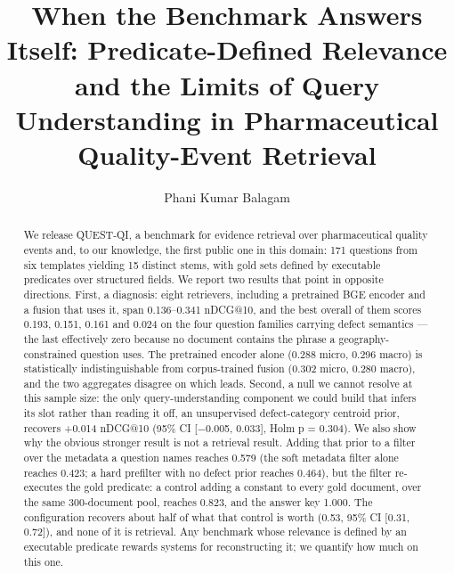 \documentclass[runningheads]{llncs}
\begin{document}
\title{When the Benchmark Answers Itself: Predicate-Defined Relevance and the Limits of Query Understanding in Pharmaceutical Quality-Event Retrieval}
\author{Phani Kumar Balagam}

\maketitle

\begin{abstract}
We release QUEST-QI, a benchmark for evidence retrieval over pharmaceutical quality events and, to our knowledge, the first public one in this domain: 171 questions from six templates yielding 15 distinct stems, with gold sets defined by executable predicates over structured fields. We report two results that point in opposite directions. First, a diagnosis: eight retrievers, including a pretrained BGE encoder and a fusion that uses it, span 0.136--0.341 nDCG@10, and the best overall of them scores 0.193, 0.151, 0.161 and 0.024 on the four question families carrying defect semantics --- the last effectively zero because no document contains the phrase a geography-constrained question uses. The pretrained encoder alone (0.288 micro, 0.296 macro) is statistically indistinguishable from corpus-trained fusion (0.302 micro, 0.280 macro), and the two aggregates disagree on which leads. Second, a null we cannot resolve at this sample size: the only query-understanding component we could build that infers its slot rather than reading it off, an unsupervised defect-category centroid prior, recovers +0.014 nDCG@10 (95\% CI [$-$0.005, 0.033], Holm p = 0.304). We also show why the obvious stronger result is not a retrieval result. Adding that prior to a filter over the metadata a question names reaches 0.579 (the soft metadata filter alone reaches 0.423; a hard prefilter with no defect prior reaches 0.464), but the filter re-executes the gold predicate: a control adding a constant to every gold document, over the same 300-document pool, reaches 0.823, and the answer key 1.000. The configuration recovers about half of what that control is worth (0.53, 95\% CI [0.31, 0.72]), and none of it is retrieval. Any benchmark whose relevance is defined by an executable predicate rewards systems for reconstructing it; we quantify how much on this one.
\end{abstract}
\end{document}
